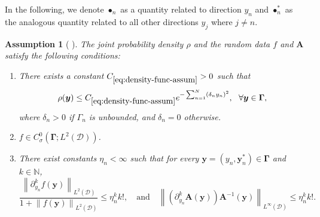 \documentclass[final,onefignum,onetabnum]{mousaviart}
\newtheorem{assumption}{Assumption}
\begin{document}
	In the following, we denote $\bullet_n$ as a quantity related to direction $y_n$ and $\bullet_n^*$ as the analogous quantity related to all other directions $y_j$ where $j\neq n$.
	
	\vspace*{1mm}
	\begin{assumption}[{ \cite[Assumption~2 and Lemma~3.2]{Babuska-Nobile-Tempone}}]
		\label{assum:convergence-A-f}
		The joint probability density $\rho$ and the random data $f$ and $\boldsymbol{A}$ satisfy the following conditions:
		\begin{enumerate}[label=\textnormal{(\alph*)}]
			\item
			\label{assum:upper-bound-density}
			There exists a constant $C_{\ref{eq:density-func-assum}}>0$ such that 
			\begin{equation}
				\label{eq:density-func-assum}
				\rho(\boldsymbol{y}) 
				\leq
				C_{\ref{eq:density-func-assum}}  
				e^{- \sum_{n=1}^N (\delta_n y_n)^2 },
				~~ \forall \boldsymbol{y} \in \boldsymbol{\Gamma},
			\end{equation}
			where $\delta_n>0$ if $\Gamma_n$ is unbounded, and $\delta_n=0$ otherwise.
			\item 
			\label{assum:f-stochastic-domin}
			$f \in C^0_{\sigma}\left( \boldsymbol{\Gamma}; L^2(\mathcal{D}) \right)$.
			\item 
			\label{assum:boundedness-derivative-random-parameter}
			There exist constants $\eta_n < \infty$ such that for every $\boldsymbol{y} = (y_n, \boldsymbol{y}^*_n) \in \boldsymbol{\Gamma}$ and $k \in \mathbb{N}$,
			\begin{equation}
				\label{assum:convergence}
				\frac{\left\|  \partial^k_{y_n} f(\boldsymbol{y}) \right\| _{L^2(\mathcal{D})}}{1+ \left\|  f(\boldsymbol{y}) \right\| _{L^2(\mathcal{D})}}
				\leq
				\eta_n^k k!,
				\quad
				\text{and}
				\quad
				\left\| 
				\left( \partial^k_{y_n} \boldsymbol{A} (\boldsymbol{y}) \right) 
				 \boldsymbol{A}^{-1}(\boldsymbol{y})
				\right\| _{L^\infty(\mathcal{D})}
				\leq
				\eta_n^k k!
				.
			\end{equation}
		\end{enumerate}
	\end{assumption}
	
\end{document}
